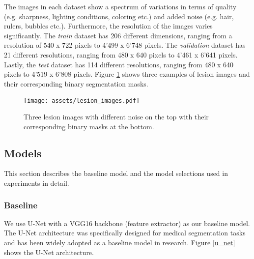 The images in each dataset show a spectrum of variations in terms of quality (e.g. sharpness, lighting conditions, coloring etc.) and added noise (e.g. hair, rulers, bubbles etc.). Furthermore, the resolution of the images varies significantly. The \emph{train} dataset has 206 different dimensions, ranging from a resolution of 540 x 722 pixels to 4'499 x 6'748 pixels. The \emph{validation} dataset has 21 different resolutions, ranging from 480 x 640 pixels to 4'461 x 6'641 pixels. Lastly, the \emph{test} dataset has 114 different resolutions, ranging from 480 x 640 pixels to 4'519 x 6'808 pixels. Figure \ref{lesion_images} shows three examples of lesion images and their corresponding binary segmentation masks.

\begin{figure}[ht]
\centering
\texttt{[image: assets/lesion\_images.pdf]}
\caption[Lesion Images]
{Three lesion images with different noise on the top with their corresponding binary masks at the bottom.}
\label{lesion_images}
\end{figure}


\subsection{Models}
This section describes the baseline model and the model selections used in experiments in detail.

\subsubsection{Baseline}

We use U-Net \citep{unet-2015-ronneberger} with a VGG16 backbone (feature extractor) as our baseline model. The U-Net architecture was specifically designed for medical segmentation tasks and has been widely adopted as a baseline model in research. Figure \ref{u_net} shows the U-Net architecture.

